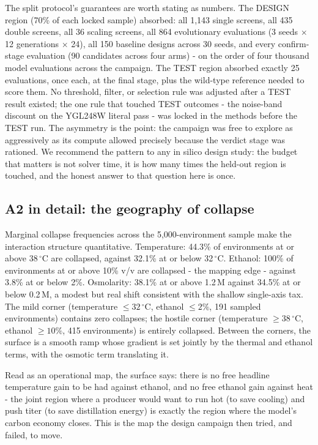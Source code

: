 \documentclass[12pt]{article}
\begin{document}
The split protocol's guarantees are worth stating as numbers. The
DESIGN region (70\% of each locked sample) absorbed: all 1,143 single
screens, all 435 double screens, all 36 scaling screens, all 864
evolutionary evaluations (3 seeds $\times$ 12 generations $\times$ 24),
all 150 baseline designs across 30 seeds, and every confirm-stage
evaluation (90 candidates across four arms) - on the order of four
thousand model evaluations across the campaign. The TEST region
absorbed exactly 25 evaluations, once each, at the final stage, plus
the wild-type reference needed to score them. No threshold, filter,
or selection rule was adjusted after a TEST result existed; the one
rule that touched TEST outcomes - the noise-band discount on the
YGL248W literal pass - was locked in the methods before the TEST run.
The asymmetry is the point: the campaign was free to explore as
aggressively as its compute allowed precisely because the verdict
stage was rationed. We recommend the pattern to any in silico design
study: the budget that matters is not solver time, it is how many
times the held-out region is touched, and the honest answer to that
question here is once.

\subsection{A2 in detail: the geography of collapse}
\label{sec:a2detail}

Marginal collapse frequencies across the 5{,}000-environment sample
make the interaction structure quantitative. Temperature: 44.3\% of
environments at or above 38\,$^{\circ}$C are collapsed, against
32.1\% at or below 32\,$^{\circ}$C. Ethanol: 100\% of environments at
or above 10\% v/v are collapsed - the mapping edge - against 3.8\%
at or below 2\%. Osmolarity: 38.1\% at or above 1.2\,M against
34.5\% at or below 0.2\,M, a modest but real shift consistent with
the shallow single-axis tax. The mild corner (temperature
$\le 32\,^{\circ}$C, ethanol $\le 2\%$, 191 sampled environments)
contains zero collapses; the hostile corner (temperature
$\ge 38\,^{\circ}$C, ethanol $\ge 10\%$, 415 environments) is
entirely collapsed. Between the corners, the surface is a smooth
ramp whose gradient is set jointly by the thermal and ethanol terms,
with the osmotic term translating it.

Read as an operational map, the surface says: there is no free
headline temperature gain to be had against ethanol, and no free
ethanol gain against heat - the joint region where a producer would
want to run hot (to save cooling) and push titer (to save
distillation energy) is exactly the region where the model's carbon
economy closes. This is the map the design campaign then tried, and
failed, to move.
\end{document}
